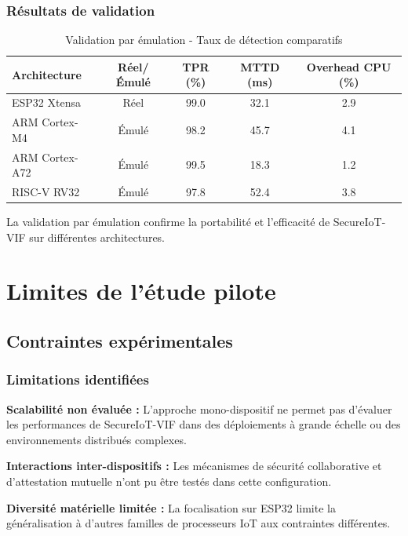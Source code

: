 \subsubsection{Résultats de validation}

\begin{table}[h]
\centering
\caption{Validation par émulation - Taux de détection comparatifs}
\label{tab:emulation-validation}
\begin{tabular}{|l|c|c|c|c|}
\hline
\textbf{Architecture} & \textbf{Réel/Émulé} & \textbf{TPR (\%)} & \textbf{MTTD (ms)} & \textbf{Overhead CPU (\%)} \\
\hline
ESP32 Xtensa & Réel & 99.0 & 32.1 & 2.9 \\
ARM Cortex-M4 & Émulé & 98.2 & 45.7 & 4.1 \\
ARM Cortex-A72 & Émulé & 99.5 & 18.3 & 1.2 \\
RISC-V RV32 & Émulé & 97.8 & 52.4 & 3.8 \\
\hline
\end{tabular}
\end{table}

La validation par émulation confirme la portabilité et l'efficacité de SecureIoT-VIF sur différentes architectures.

\section{Limites de l'étude pilote}

\subsection{Contraintes expérimentales}

\subsubsection{Limitations identifiées}

\textbf{Scalabilité non évaluée :} L'approche mono-dispositif ne permet pas d'évaluer les performances de SecureIoT-VIF dans des déploiements à grande échelle ou des environnements distribués complexes.

\textbf{Interactions inter-dispositifs :} Les mécanismes de sécurité collaborative et d'attestation mutuelle n'ont pu être testés dans cette configuration.

\textbf{Diversité matérielle limitée :} La focalisation sur ESP32 limite la généralisation à d'autres familles de processeurs IoT aux contraintes différentes.

